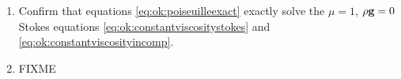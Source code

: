 \begin{enumerate}
\item \label{exer:ok:poiseuilleverify}  Confirm that equations \eqref{eq:ok:poiseuilleexact} exactly solve the $\mu=1$, $\rho\mathbf{g}=0$ Stokes equations \eqref{eq:ok:constantviscositystokes} and \eqref{eq:ok:constantviscosityincomp}.

\item \label{exer:ok:smalldetails}  FIXME

\end{enumerate}
